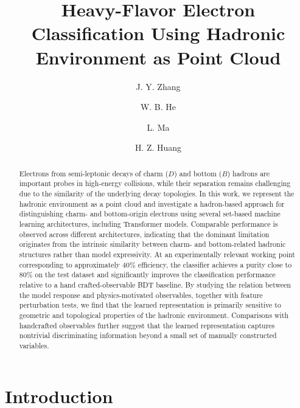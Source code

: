 \documentclass[preprint,12pt]{elsarticle}
\begin{document}
\begin{frontmatter}

\title{Heavy-Flavor Electron Classification Using Hadronic Environment as Point Cloud}

\author[a]{J. Y. Zhang}
\author[a]{W. B. He}
\author[a]{L. Ma}
\author[a]{H. Z. Huang}


\address[a]{Key Laboratory of Nuclear Physics and Ion-beam Application (MOE), Institute of Modern Physics, Fudan University, Shanghai 200433, China}

\begin{abstract}

Electrons from semi-leptonic decays of charm ($D$) and bottom ($B$) hadrons are important probes in high-energy collisions, while their separation remains challenging due to the similarity of the underlying decay topologies. In this work, we represent the hadronic environment as a point cloud and investigate a hadron-based approach for distinguishing charm- and bottom-origin electrons using several set-based machine learning architectures, including Transformer models. Comparable performance is observed across different architectures, indicating that the dominant limitation originates from the intrinsic similarity between charm- and bottom-related hadronic structures rather than model expressivity. At an experimentally relevant working point corresponding to approximately 40\% efficiency, the classifier achieves a purity close to 80\% on the test dataset and significantly improves the classification performance relative to a hand crafted-observable BDT baseline. By studying the relation between the model response and physics-motivated observables, together with feature perturbation tests, we find that the learned representation is primarily sensitive to geometric and topological properties of the hadronic environment. Comparisons with handcrafted observables further suggest that the learned representation captures nontrivial discriminating information beyond a small set of manually constructed variables.

\end{abstract}

\end{frontmatter}


\section{Introduction}
\end{document}
